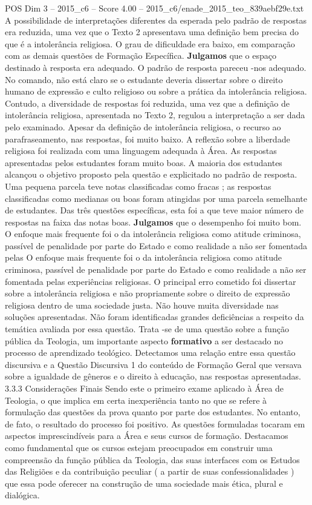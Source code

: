 \begin{textsample}{POS Dim 3 – 2015\_c6 – Score 4.00 – 2015\_c6/enade\_2015\_teo\_839aebf29e.txt}
A possibilidade de interpretações diferentes da esperada pelo padrão de respostas era reduzida, uma vez que o Texto 2 apresentava uma definição bem precisa do que é a intolerância religiosa.
O grau de dificuldade era baixo, em comparação com as demais questões de Formação Específica. \textbf{Julgamos} que o espaço destinado à resposta era adequado.
O padrão de resposta pareceu -nos adequado.
No comando, não está claro se o estudante deveria dissertar sobre o direito humano de expressão e culto religioso ou sobre a prática da intolerância religiosa.
Contudo, a diversidade de respostas foi reduzida, uma vez que a definição de intolerância religiosa, apresentada no Texto 2, regulou a interpretação a ser dada pelo examinado.
Apesar da definição de intolerância religiosa, o recurso ao parafraseamento, nas respostas, foi muito baixo.
A reflexão sobre a liberdade religiosa foi realizada com uma linguagem adequada à Área.
As respostas apresentadas pelos estudantes foram muito boas.
A maioria dos estudantes alcançou o objetivo proposto pela questão e explicitado no padrão de resposta.
Uma pequena parcela teve notas classificadas como fracas ; as respostas classificadas como medianas ou boas foram atingidas por uma parcela semelhante de estudantes.
Das três questões específicas, esta foi a que teve maior número de respostas na faixa das notas boas. \textbf{Julgamos} que o desempenho foi muito bom.
O enfoque mais frequente foi o da intolerância religiosa como atitude criminosa, passível de penalidade por parte do Estado e como realidade a não ser fomentada pelas O enfoque mais frequente foi o da intolerância religiosa como atitude criminosa, passível de penalidade por parte do Estado e como realidade a não ser fomentada pelas experiências religiosas.
O principal erro cometido foi dissertar sobre a intolerância religiosa e não propriamente sobre o direito de expressão religiosa dentro de uma sociedade justa.
Não houve muita diversidade nas soluções apresentadas.
Não foram identificadas grandes deficiências a respeito da temática avaliada por essa questão.
Trata -se de uma questão sobre a função pública da Teologia, um importante aspecto \textbf{formativo} a ser destacado no processo de aprendizado teológico.
Detectamos uma relação entre essa questão discursiva e a Questão Discursiva 1 do conteúdo de Formação Geral que versava sobre a igualdade de gêneros e o direito à educação, nas respostas apresentadas. 3.3.3 Considerações Finais Sendo este o primeiro exame aplicado à Área de Teologia, o que implica em certa inexperiência tanto no que se refere à formulação das questões da prova quanto por parte dos estudantes.
No entanto, de fato, o resultado do processo foi positivo.
As questões formuladas tocaram em aspectos imprescindíveis para a Área e seus cursos de formação.
Destacamos como fundamental que os cursos estejam preocupados em construir uma compreensão da função pública da Teologia, das suas interfaces com os Estudos das Religiões e da contribuição peculiar ( a partir de suas confessionalidades ) que essa pode oferecer na construção de uma sociedade mais ética, plural e dialógica.

\end{textsample}
